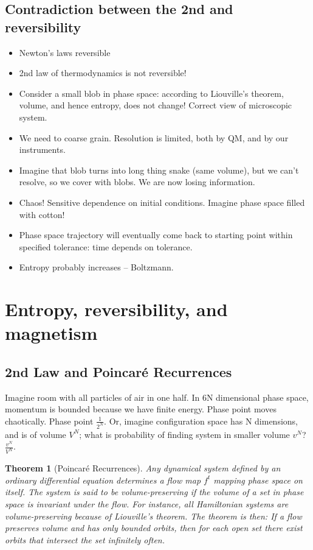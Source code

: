 \documentclass[]{article}
\newtheorem{thm}{Theorem}
\begin{document}
\subsection{Contradiction between the 2nd and reversibility}
\begin{itemize}
	\item Newton's laws reversible
	\item 2nd law of thermodynamics is not reversible!
	\item Consider a small blob in phase space: according to Liouville's theorem, volume, and hence entropy, does not change! Correct view of microscopic system.
	\item We need to coarse grain. Resolution is limited, both by QM, and by our instruments.
	\item Imagine that blob turns into long thing snake (same volume), but we can't resolve, so we cover with blobs. We are now losing information. 
	\item Chaos! Sensitive dependence on initial conditions. Imagine phase space filled with cotton!
	
	\item Phase space trajectory will eventually come back to starting point within specified tolerance: time depends on tolerance.
	
	\item Entropy probably increases -- Boltzmann. 
\end{itemize}


\section{Entropy, reversibility, and magnetism}

\subsection{2nd Law and Poincar\'e Recurrences}

Imagine room with all particles of air in one half. In 6N dimensional phase space, momentum is bounded because we have finite energy. Phase point moves chaotically. Phase point $\frac{1}{2^N}$. Or, imagine configuration space has N dimensions, and is of volume $V^N$; what is probability of finding system in smaller volume $v^N$? $\frac{v^N}{V^N}$. 

\begin{thm}[Poincar\'e Recurrences]
	Any dynamical system defined by an ordinary differential equation determines a flow map $f^t$ mapping phase space on itself. The system is said to be volume-preserving if the volume of a set in phase space is invariant under the flow. For instance, all Hamiltonian systems are volume-preserving because of Liouville's theorem. The theorem is then: If a flow preserves volume and has only bounded orbits, then for each open set there exist orbits that intersect the set infinitely often.
\end{thm}
\end{document}
